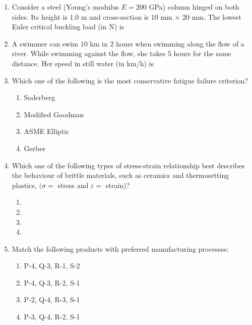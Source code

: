 \documentclass[journal,9pt,onecolumn]{IEEEtran}
\begin{document}
\begin{enumerate}

\item Consider a steel (Young's modulus $E = 200$ GPa) column hinged on both sides. Its height is $1.0$ m and cross-section is $10$ mm $\times$ $20$ mm. The lowest Euler critical buckling load (in N) is


\item A swimmer can swim $10$ km in $2$ hours when swimming along the flow of a river. While swimming against the flow, she takes $5$ hours for the same distance. Her speed in still water (in km/h) is


\item Which one of the following is the most conservative fatigue failure criterion?
\begin{multicols}{4}
\begin{enumerate}
    \item Soderberg
    \item Modified Goodman
    \item ASME Elliptic
    \item Gerber
\end{enumerate}
\end{multicols}

\item Which one of the following types of stress-strain relationship best describes the behaviour of brittle materials, such as ceramics and thermosetting plastics, $(\sigma =$ stress and  $\varepsilon =$ strain)?

\begin{multicols}{2}
\begin{enumerate}
    \item 
    \item 
    \item 
    \item 
\end{enumerate}
\end{multicols}




\item Match the following products with preferred manufacturing processes:
\begin{table}[h!]
    \centering
    
    \label{tab:ME-2015}
\end{table}
\begin{multicols}{4}
\begin{enumerate}
    \item P-4, Q-3, R-1, S-2
    \item P-4, Q-3, R-2, S-1
    \item P-2, Q-4, R-3, S-1
    \item P-3, Q-4, R-2, S-1
\end{enumerate}
\end{multicols}



\end{enumerate}
\end{document}
